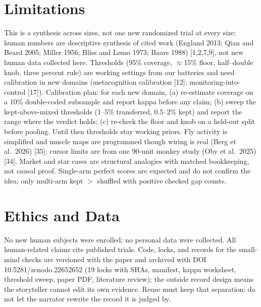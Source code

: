 \documentclass[11pt,a4paper]{article}
\begin{document}
\section{Limitations}
This is a synthesis across sizes, not one new randomized trial at every size; human numbers are descriptive synthesis of cited work (England 2013; Qian and Beard 2005; Miller 1956; Bliss and L{\o}mo 1973; Baars 1988) [1,2,7,9], not new human data collected here. Thresholds (95\% coverage, $\approx$15\% floor, half--double knob, three percent rule) are working settings from our batteries and need calibration in new domains (metacognition calibration [12]; monitoring-into-control [17]). Calibration plan: for each new domain, (a) re-estimate coverage on a 10\% double-coded subsample and report kappa before any claim; (b) sweep the kept-above-mixed thresholds (1--5\% transferred, 0.5--2\% kept) and report the range where the verdict holds; (c) re-check the floor and knob on a held-out split before pooling. Until then thresholds stay working priors. Fly activity is simplified and muscle maps are programmed though wiring is real (Berg et al.\ 2026) [35]; cursor limits are from one 90-unit monkey study (Oby et al.\ 2025) [34]. Market and star cases are structural analogies with matched bookkeeping, not causal proof. Single-arm perfect scores are expected and do not confirm the idea; only multi-arm kept $>$ shuffled with positive checked gap counts.

\section{Ethics and Data}
No new human subjects were enrolled; no personal data were collected. All human-related claims cite published trials. Code, locks, and records for the small-mind checks are versioned with the paper and archived with DOI 10.5281/zenodo.22652652 (19 locks with SHAs, manifest, kappa worksheet, threshold sweep, paper PDF, literature review); the outside record design means the storyteller cannot edit its own evidence. Reuse must keep that separation: do not let the narrator rewrite the record it is judged by.
\end{document}
